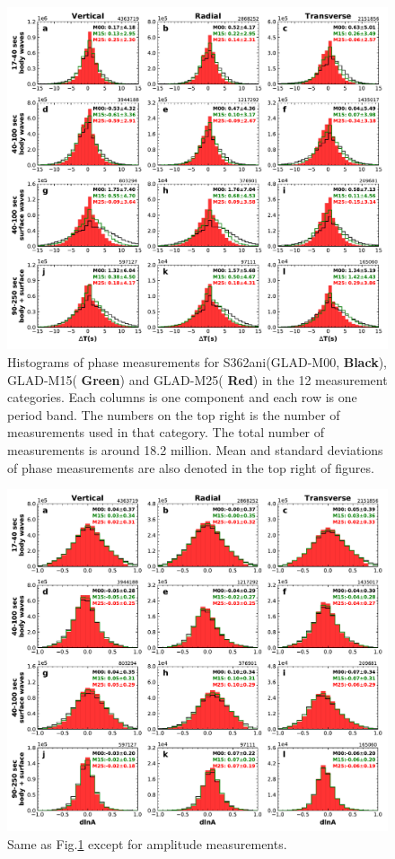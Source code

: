 \documentclass[extra,mreferee]{gji}
\begin{document}
\begin{figure}
  \centering
  \includegraphics[width=\textwidth]{figures/dt_histogram.pdf}
  \caption{Histograms of phase measurements for S362ani(GLAD-M00, \textbf{Black}), GLAD-M15(\textbf{{\color{ForestGreen} Green}}) and GLAD-M25(\textbf{{\color{Red} Red}}) in the 12 measurement categories. Each columns is one component and each row is one period band. The numbers on the top right is the number of measurements used in that category. The total number of measurements is around 18.2 million. Mean and standard deviations of phase measurements are also denoted in the top right of figures.}
  \label{fig:phase_hist}
\end{figure}

\begin{figure}
  \centering
  \includegraphics[width=\textwidth]{figures/dlna_histogram.pdf}
  \caption{Same as Fig.\ref{fig:phase_hist} except for amplitude measurements.}
\end{figure}
\end{document}
